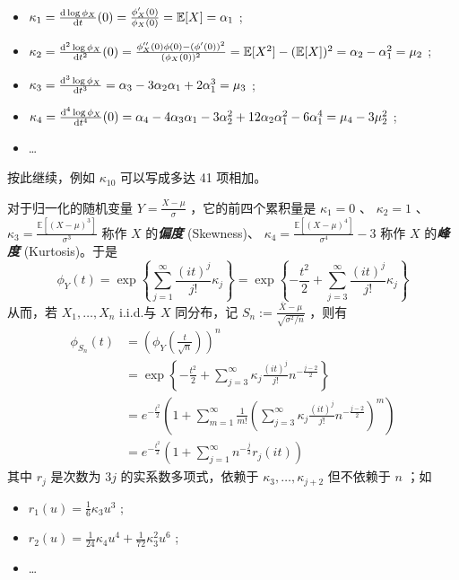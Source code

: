 \begin{itemize}
\tightlist
\item
  $\kappa_1=\frac{{\rm d}\log \phi_X}{\mathrm{d}t}(0)=\frac{\phi'_X(0)}{\phi_X(0)}=\mathbb{E}[X]=\alpha_1$ ;
\item
  $\kappa_2=\frac{{\rm d}^2\log \phi_X}{\mathrm{d}t^2}(0)=\frac{\phi''_X(0)\phi(0)-(\phi'(0))^2}{(\phi_X(0))^2}=\mathbb{E}[X^2]-(\mathbb{E}[X])^2=\alpha_2-\alpha_1^2=\mu_2$ ;
\item
  $\kappa_3=\frac{{\rm d}^3\log\phi_X}{\mathrm{d}t^3}=\alpha_3-3\alpha_2\alpha_1+2\alpha_1^3=\mu_3$ ;
\item
  $\kappa_4=\frac{{\rm d}^4\log \phi_X}{\mathrm{d}t^4}(0)=\alpha_4-4\alpha_3\alpha_1-3\alpha_2^2+12\alpha_2\alpha_1^2-6\alpha_1^4=\mu_4-3\mu_2^2$ ;
\item
  \ldots{}
\end{itemize}

按此继续，例如 $\kappa_{10}$ 可以写成多达 41 项相加。

对于归一化的随机变量 $Y=\frac{X-\mu}{\sigma}$ ，它的前四个累积量是 $\kappa_1=0$ 、 $\kappa_2=1$ 、 $\kappa_3=\frac{\mathbb{E}[(X-\mu)^3]}{\sigma^3}$ 称作 $X$ 的\textbf{\emph{偏度}} (Skewness)、 $\kappa_4=\frac{\mathbb{E}[(X-\mu)^4]}{\sigma^4}-3$ 称作 $X$ 的\textbf{\emph{峰度}} (Kurtosis)。于是\[ \phi_Y(t) = \exp \left\{ \sum_{j = 1}^\infty \frac{(it)^j}{j!} \kappa_j \right\} = \exp \left\{ -\frac{t^2}{2} + \sum_{j = 3}^\infty \frac{(it)^j}{j!} \kappa_j \right\} \]从而，若 $X_1,\dots,X_n$ i.i.d.与 $X$ 同分布，记 $S_n:=\frac{\bar{X}-\mu}{\sqrt{\sigma^2/n}}$ ，则有\[\begin{aligned} \phi_{S_n}(t) &= \left(\phi_Y\left(\frac{t}{\sqrt{n}}\right)\right)^n \\ &= \exp\left\{ -\frac{t^2}{2} + \sum_{j = 3}^\infty \kappa_j \frac{(it)^j}{j!} n^{-\frac{j-2}{2}} \right\} \\ &=e^{-\frac{t^2}{2}}\left(1+\sum_{m=1}^\infty\frac1{m!}\left(\sum_{j=3}^\infty\kappa_j \frac{(it)^j}{j!} n^{-\frac{j-2}{2}} \right)^m\right)\\ &= e^{-\frac{t^2}{2}} \left( 1 + \sum_{j = 1}^\infty n^{-\frac{j}{2}} r_j(it)\right) \end{aligned}\]
其中 $r_j$ 是次数为 $3j$ 的实系数多项式，依赖于 $\kappa_3,\dots,\kappa_{j+2}$ 但不依赖于 $n$ ；如

\begin{itemize}
\tightlist
\item
  $r_1(u)=\frac16\kappa_3u^3$ ;
\item
  $r_2(u)=\frac1{24}\kappa_4 u^4+\frac1{72}\kappa_3^2u^6$ ;
\item
  \ldots{}
\end{itemize}

